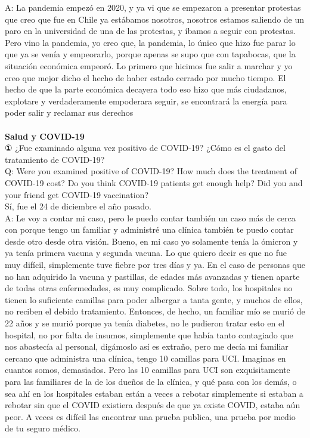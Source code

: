 \documentclass{phyasgn}\usepackage{nag}
\begin{document}
A: La pandemia empezó en 2020, y ya vi que se empezaron a presentar protestas que creo que fue en Chile ya estábamos nosotros, nosotros estamos saliendo de un paro en la universidad de una de las protestas, y íbamos a seguir con protestas. Pero vino la pandemia, yo creo que, la pandemia, lo único que hizo fue parar lo que ya se venía y empeorarlo, porque apenas se supo que con tapabocas, que la situación económica empeoró. Lo primero que hicimos fue salir a marchar y yo creo que mejor dicho el hecho de haber estado cerrado por mucho tiempo. El hecho de que la parte económica decayera todo eso hizo que más ciudadanos, explotare y verdaderamente empoderara seguir, se encontrará la energía para poder salir y reclamar sus derechos\\
\\
\textbf{Salud y COVID-19}\\
① ¿Fue examinado alguna vez positivo de COVID-19? ¿Cómo es el gasto del tratamiento de COVID-19? \\
	Q: Were you examined positive of COVID-19? How much does the treatment of COVID-19 cost? Do you think COVID-19 patients get enough help? Did you and your friend get COVID-19 vaccination?\\
Sí, fue el 24 de diciembre el año pasado.\\
A: Le voy a contar mi caso, pero le puedo contar también un caso más de cerca con porque tengo un familiar y administré una clínica también te puedo contar desde otro desde otra visión. Bueno, en mi caso yo solamente tenía la ómicron y ya tenía primera vacuna y segunda vacuna. Lo que quiero decir es que no fue muy difícil, simplemente tuve fiebre por tres días y ya. En el caso de personas que no han adquirido la vacuna y pastillas, de edades más avanzadas y tienen aparte de todas otras enfermedades, es muy complicado. Sobre todo, los hospitales no tienen lo suficiente camillas para poder albergar a tanta gente, y muchos de ellos, no reciben el debido tratamiento. Entonces, de hecho, un familiar mío se murió de 22 años y se murió porque ya tenía diabetes, no le pudieron tratar esto en el hospital, no por falta de insumos, simplemente que había tanto contagiado que nos abastecía al personal, digámoslo así es extraño, pero me decía mi familiar cercano que administra una clínica, tengo 10 camillas para UCI. Imaginas en cuantos somos, demasiados. Pero las 10 camillas para UCI son exquisitamente para las familiares de la de los dueños de la clínica, y qué pasa con los demás, o sea ahí en los hospitales estaban están a veces a rebotar simplemente si estaban a rebotar sin que el COVID existiera después de que ya existe COVID, estaba aún peor. A veces es difícil las encontrar una prueba publica, una prueba por medio de tu seguro médico.\\
\end{document}
